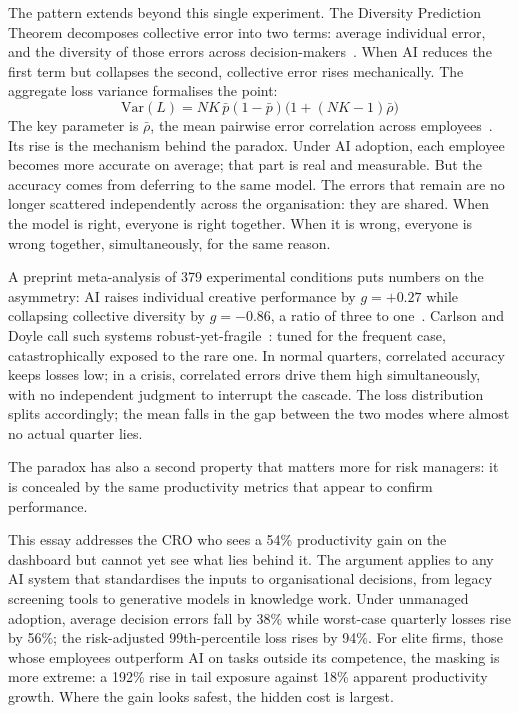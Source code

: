\documentclass[11pt,a4paper]{article}
\begin{document}
The pattern extends beyond this single experiment.
The Diversity Prediction Theorem decomposes collective error into two terms:
average individual error, and the diversity of those errors across
decision-makers~\cite{page_princeton_2007,krogh_nips_1995}.
When AI reduces the first term but collapses the second, collective error rises
mechanically.
The aggregate loss variance formalises the point:
\[
  \text{Var}(L) = NK\,\bar{p}(1-\bar{p})\bigl(1 + (NK-1)\bar{\rho}\bigr)
\]
\noindent The key parameter is $\bar{\rho}$, the mean pairwise error correlation
across employees~\cite{wood_jmlr_2023}.
Its rise is the mechanism behind the paradox.
Under AI adoption, each employee becomes more accurate on average; that part is
real and measurable.
But the accuracy comes from deferring to the same model.
The errors that remain are no longer scattered independently across the
organisation: they are shared.
When the model is right, everyone is right together.
When it is wrong, everyone is wrong together, simultaneously, for the same reason.

A preprint meta-analysis of 379 experimental conditions puts numbers on the
asymmetry: AI raises individual creative performance by $g = +0.27$ while
collapsing collective diversity by $g = -0.86$, a ratio of three to
one~\cite{holzner_arxiv_2025,doshi_sciadv_2024}.
Carlson and Doyle call such systems robust-yet-fragile~\cite{carlson_prl_2000}:
tuned for the frequent case, catastrophically exposed to the rare one.
In normal quarters, correlated accuracy keeps losses low; in a crisis, correlated
errors drive them high simultaneously, with no independent judgment to interrupt
the cascade.
The loss distribution splits accordingly; the mean falls in the gap between the
two modes where almost no actual quarter lies.

The paradox has also a second property that matters more for risk managers: it is
concealed by the same productivity metrics that appear to confirm performance.

This essay addresses the CRO who sees a 54\% productivity gain on the dashboard
but cannot yet see what lies behind it.
The argument applies to any AI system that standardises the inputs to
organisational decisions, from legacy screening tools to generative models in
knowledge work.
Under unmanaged adoption, average decision errors fall by 38\% while worst-case
quarterly losses rise by 56\%; the risk-adjusted 99th-percentile loss rises
by 94\%.
For elite firms, those whose employees outperform AI on tasks outside its
competence, the masking is more extreme: a 192\% rise in tail exposure against
18\% apparent productivity growth.
Where the gain looks safest, the hidden cost is largest.
\end{document}
